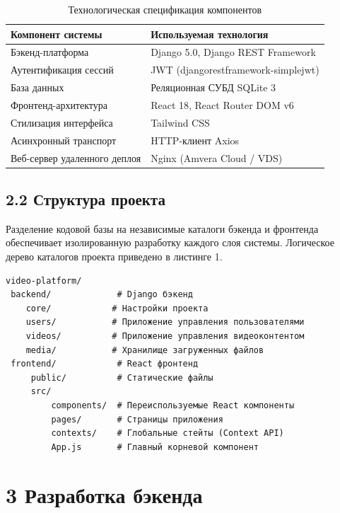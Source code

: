 \documentclass[a4paper,14pt,oneside,openany]{memoir}
\begin{document}
\begin{table}[H]
\centering
\small
\caption{Технологическая спецификация компонентов}
\begin{tabular}{|l|l|}
\hline
\textbf{Компонент системы} & \textbf{Используемая технология} \\ \hline
Бэкенд-платформа & Django 5.0, Django REST Framework \\ \hline
Аутентификация сессий & JWT (djangorestframework-simplejwt) \\ \hline
База данных & Реляционная СУБД SQLite 3 \\ \hline
Фронтенд-архитектура & React 18, React Router DOM v6 \\ \hline
Стилизация интерфейса & Tailwind CSS \\ \hline
Асинхронный транспорт & HTTP-клиент Axios \\ \hline
Веб-сервер удаленного деплоя & Nginx (Amvera Cloud / VDS) \\ \hline
\end{tabular}
\end{table}

\subsection{2.2 Структура проекта}
Разделение кодовой базы на независимые каталоги бэкенда и фронтенда обеспечивает изолированную разработку каждого слоя системы. Логическое дерево каталогов проекта приведено в листинге 1.

\begin{lstlisting}[caption={Структура проекта MyTube}]
video-platform/
 backend/             # Django бэкенд
    core/            # Настройки проекта
    users/           # Приложение управления пользователями
    videos/          # Приложение управления видеоконтентом
    media/           # Хранилище загруженных файлов
 frontend/            # React фронтенд
     public/          # Статические файлы
     src/
         components/  # Переиспользуемые React компоненты
         pages/       # Страницы приложения
         contexts/    # Глобальные стейты (Context API)
         App.js       # Главный корневой компонент
\end{lstlisting}

\section{3 Разработка бэкенда}
\end{document}
